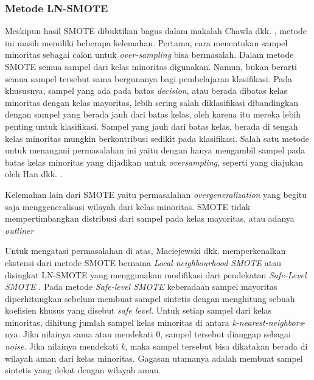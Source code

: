 \subsubsection{Metode LN-SMOTE}

Meskipun hasil SMOTE dibuktikan bagus dalam makalah Chawla dkk. \cite{chawla2002smote}, metode ini masih memiliki beberapa kelemahan.
Pertama, cara menentukan sampel minoritas sebagai calon untuk \textit{over-sampling} bisa bermasalah.
Dalam metode SMOTE semua sampel dari kelas minoritas digunakan.
Namun, bukan berarti semua sampel tersebut sama bergunanya bagi pembelajaran klasifikasi.
Pada khususnya, sampel yang ada pada batas \textit{decision}, atau berada dibatas kelas minoritas dengan kelas mayoritas, lebih sering salah diklasifikasi dibandingkan dengan sampel yang berada jauh dari batas kelas, oleh karena itu mereka lebih penting untuk klasifikasi.
Sampel yang jauh dari batas kelas, berada di tengah kelas minoritas mungkin berkontribusi sedikit pada klasifikasi.
Salah satu metode untuk menangani permasalahan ini yaitu dengan hanya mengambil sampel pada batas kelas minoritas yang dijadikan untuk \textit{oversampling}, seperti yang diajukan oleh Han dkk. \cite{han2005borderline}.

Kelemahan lain dari SMOTE yaitu permasalahan \textit{overgeneralization} yang begitu saja menggeneralisasi wilayah dari kelas minoritas.
SMOTE tidak mempertimbangkan distribusi dari sampel pada kelas mayoritas, atau adanya \textit{outliner}

Untuk mengatasi permasalahan di atas, Maciejewski dkk. memperkenalkan ekstensi dari metode SMOTE bernama \textit{Local-neighbourhood SMOTE} atau disingkat LN-SMOTE \cite{maciejewski2011local} yang menggunakan modifikasi dari pendekatan \textit{Safe-Level SMOTE} \cite{bunkhumpornpat2009safe}.
Pada metode \textit{Safe-level SMOTE} keberadaan sampel mayoritas diperhitungkan sebelum membuat sampel sintetis dengan menghitung sebuah koefisien khusus yang disebut \textit{safe level}.
Untuk setiap sampel dari kelas minoritas, dihitung jumlah sampel kelas minoritas di antara \textit{k-nearest-neighbors}-nya.
Jika nilainya sama atau mendekati 0, sampel tersebut dianggap sebagai \textit{noise}.
Jika nilainya mendekati \textit{k}, maka sampel tersebut bisa dikatakan berada di wilayah aman dari kelas minoritas.
Gagasan utamanya adalah membuat sampel sintetis yang dekat dengan wilayah aman.

